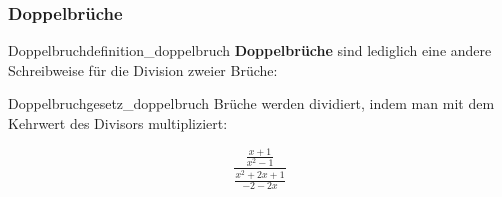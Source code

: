 \subsubsection{Doppelbrüche}



\begin{definition}{Doppelbruch}{definition_doppelbruch}
  \textbf{Doppelbrüche} sind lediglich eine andere Schreibweise für die
  Division zweier Brüche:\\

  \begin{center}
  \end{center}
\end{definition}

\begin{gesetz}{Doppelbruch}{gesetz_doppelbruch}
  Brüche werden dividiert, indem man mit dem Kehrwert des Divisors multipliziert:\\

  \begin{center}
  \end{center}
\end{gesetz}

\begin{beispiel}{}{}
$$\frac{\frac{x+1}{x^2-1}}{\frac{x^2+2x+1}{-2-2x}}$$
\end{beispiel}



